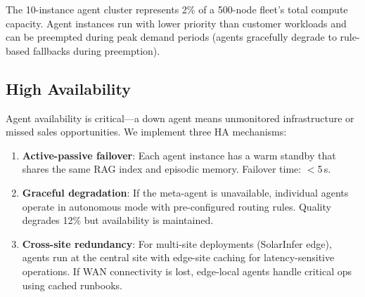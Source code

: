 \documentclass[conference,10pt,letterpaper]{IEEEtran}
\begin{document}
\begin{table}[!t]
\caption{Agent Infrastructure Allocation}
\label{tab:infra}
\centering\scriptsize
{}
\end{table}

The 10-instance agent cluster represents 2\% of a 500-node fleet's total compute capacity. Agent instances run with lower priority than customer workloads and can be preempted during peak demand periods (agents gracefully degrade to rule-based fallbacks during preemption).

\subsection{High Availability}

Agent availability is critical---a down agent means unmonitored infrastructure or missed sales opportunities. We implement three HA mechanisms:

\begin{enumerate}
\item \textbf{Active-passive failover}: Each agent instance has a warm standby that shares the same RAG index and episodic memory. Failover time: $<$5\,s.
\item \textbf{Graceful degradation}: If the meta-agent is unavailable, individual agents operate in autonomous mode with pre-configured routing rules. Quality degrades 12\% but availability is maintained.
\item \textbf{Cross-site redundancy}: For multi-site deployments (SolarInfer edge), agents run at the central site with edge-site caching for latency-sensitive operations. If WAN connectivity is lost, edge-local agents handle critical ops using cached runbooks.
\end{enumerate}
\end{document}
